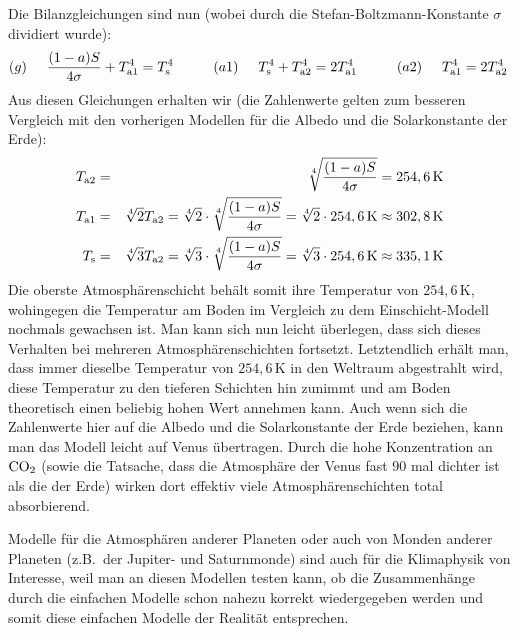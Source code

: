 Die Bilanzgleichungen sind nun (wobei durch die Stefan-Boltzmann-Konstante $\sigma$ dividiert
wurde):
\begin{equation}
       (g) \hspace{0.5cm}   \frac{(1-a)S}{4\sigma} + T_{\rm a1}^4 = T_{\rm s}^4 
       \hspace{1cm} (a1) \hspace{0.5cm}   
        T_{\rm s}^4 + T_{\rm a2}^4 = 2  T_{\rm a1}^4 
       \hspace{1cm} (a2) \hspace{0.5cm}   
        T_{\rm a1}^4 = 2  T_{\rm a2}^4  \, 
\end{equation}
Aus diesen Gleichungen erhalten wir (die Zahlenwerte gelten zum besseren Vergleich mit den
vorherigen Modellen f\"ur die Albedo und die Solarkonstante der Erde):
\begin{eqnarray}
         T_{\rm a2} &=& \sqrt[4]{\frac{(1-a) S}{4 \sigma}} = 254,6\,{\rm K}  \\
         T_{\rm a1} &=& \sqrt[4]{2} T_{\rm a2} =  \sqrt[4]{2}\cdot
                                   \sqrt[4]{\frac{(1-a) S}{4 \sigma}} = \sqrt[4]{2}\cdot 254,6\,{\rm K} 
                                      \approx 302,8\, {\rm K} \\
         T_{\rm s} &=& \sqrt[4]{3} T_{\rm a2} 
                                =  \sqrt[4]{3} \cdot \sqrt[4]{\frac{(1-a) S}{4 \sigma}} = \sqrt[4]{3} \cdot 254,6\,{\rm K} 
                                      \approx 335,1\, {\rm K} 
\end{eqnarray}
Die oberste Atmosph\"arenschicht beh\"alt somit ihre Temperatur von $254,6$\,K, wohingegen die
Temperatur am Boden im Vergleich zu dem Einschicht-Modell nochmals gewachsen ist. Man kann
sich nun leicht \"uberlegen, dass sich dieses Verhalten bei mehreren Atmosph\"arenschichten fortsetzt. 
Letztendlich erh\"alt man, dass immer dieselbe Temperatur von $254,6$\,K in den Weltraum abgestrahlt
wird, diese Temperatur zu den tieferen Schichten hin zunimmt und am Boden theoretisch einen
beliebig hohen Wert annehmen kann. Auch wenn sich die Zahlenwerte hier auf die Albedo und die
Solarkonstante der Erde beziehen, kann man das Modell leicht auf Venus \"ubertragen. Durch die hohe
Konzentration an ${\rm CO}_2$ (sowie die Tatsache, dass die Atmosph\"are der Venus fast 90 mal
dichter ist als die der Erde)
wirken dort effektiv viele Atmosph\"arenschichten total absorbierend.

Modelle f\"ur die Atmosph\"aren anderer Planeten oder auch von Monden anderer Planeten (z.B.\ der
Jupiter- und Saturnmonde) sind auch f\"ur die Klimaphysik von Interesse, weil man an diesen
Modellen testen kann, ob die Zusammenh\"ange durch die einfachen Modelle schon nahezu korrekt
wiedergegeben werden und somit diese einfachen Modelle der Realit\"at entsprechen.


